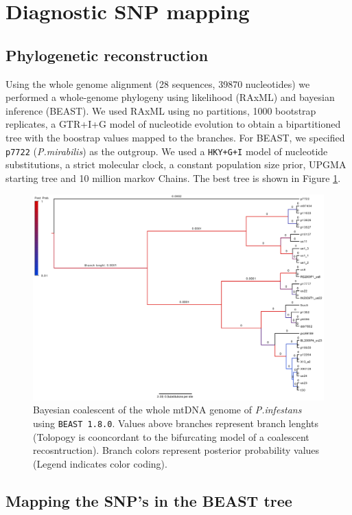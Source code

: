\documentclass{article}\usepackage[]{graphicx}\usepackage[]{color}
\begin{document}
\section{Diagnostic SNP mapping} 
\subsection{Phylogenetic reconstruction}
Using the whole genome alignment (28 sequences, 39870 nucleotides) we performed a whole-genome phylogeny using likelihood (RAxML) and bayesian inference (BEAST). We used RAxML using no partitions, 1000 bootstrap replicates, a GTR+I+G model of nucleotide evolution to obtain a bipartitioned tree with the boostrap values mapped to the branches. For BEAST, we specified \texttt{p7722} (\emph{P.mirabilis}) as the outgroup. We used a \texttt{HKY+G+I} model of nucleotide substitutions, a strict molecular clock, a constant population size prior, UPGMA starting tree and 10 million markov Chains. The best tree is shown in Figure \ref{fig:BEAST}.

\begin{figure}[h!]
\centering
\includegraphics[scale=0.3]{Beast_branchlenghts.jpg}
\caption[BEAST Coalescent tree]{Bayesian coalescent of the whole mtDNA genome of \emph{P.infestans} using \texttt{BEAST 1.8.0}. Values above branches represent branch lenghts (Tolopogy is cooncordant to the bifurcating model of a coalescent recosntruction). Branch colors represent posterior probability values (Legend indicates color coding).}
\label{fig:BEAST}
\end{figure}

\subsection{Mapping the SNP's in the BEAST tree}
\end{document}
